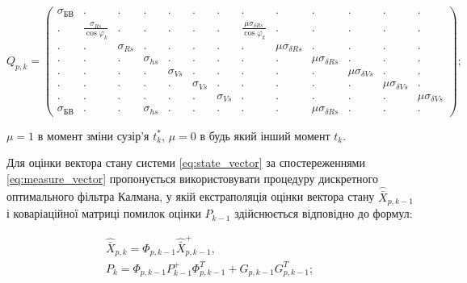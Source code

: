 \[Q_{p,k} =\left(
\begin{array}{ccccccccccccc} 
{\scriptstyle \sigma_{\text{БВ}} } & {.} & {.} & {.} & {.} & {.} & {.} & {.} & {.} & {.} & {.} & {.} & {.} \\ 
{.} & {\scriptstyle \frac{\sigma_{Rs}}{\cos \varphi_{k}}}& {.} & {.} & {.} & {.} & {.} & 
{\scriptstyle \frac{\mu \sigma_{\delta Rs}}{\cos \varphi_{k}}} & {.} & {.} & {.} & {.} & {.} \\ 
{.} & {.} & { \scriptstyle\sigma_{Rs} } & {.} & {.} & {.} & {.} & {.} & {\scriptstyle \mu \sigma_{\delta Rs} } & {.} & {.} & {.} & {.} \\ 
{.} & {.} & {.} & {\scriptstyle \sigma_{hs} } & {.} & {.} & {.} & {.} & {.} & {\scriptstyle \mu \sigma_{\delta Rs} } & {.} & {.} & {.} \\ 
{.} & {.} & {.} & {.} & {\scriptstyle \sigma_{Vs} } & {.} & {.} & {.} & {.} & {.} & {\scriptstyle \mu \sigma_{\delta Vs} } & {.} & {.} \\ 
{.} & {.} & {.} & {.} & {.} & {\scriptstyle \sigma_{Vs} } & {.} & {.} & {.} & {.} & {.} & {\scriptstyle \mu \sigma_{\delta Vs} } & {.} \\ 
{.} & {.} & {.} & {.} & {.} & {.} & {\scriptstyle \sigma_{Vs} } & {.} & {.} & {.} & {.} & {.} & {\scriptstyle \mu \sigma_{\delta Vs} } \\ 
{\scriptstyle \sigma_{\text{БВ}}} & {.} & {.} & { \scriptstyle\sigma_{hs} } & {.} & {.} & {.} & {.} & {.} & {\scriptstyle \mu \sigma_{\delta Rs}} & {.} & {.} & {.} 
\end{array}\right);\] 
\begin{ESKDexplanation}
\item $\mu =1$ в момент зміни сузір'я $t_{k}^{*} $, $\mu =0$ в будь який інший момент $t_{k}^{} $.
\end{ESKDexplanation}

Для оцінки вектора стану системи \eqref{eq:state_vector} за спостереженнями \eqref{eq:measure_vector} 
пропонується використовувати процедуру дискретного оптимального фільтра Калмана, 
у якій екстраполяція оцінки вектора стану $\stackrel{\frown}{\bar{X}}_{p,k-1} $ і 
коваріаційної матриці помилок оцінки $P_{k-1} $ здійснюється відповідно до формул:

\begin{equation} 
\label{eq:kalman_predict} \begin{array}{l} 
{\hat{\bar{X}}_{p,k} =\Phi_{p,k-1} \hat{\bar{X}}^{+}_{p,k-1} ,} \\ 
{P_{k} =\Phi_{p,k-1} P^{+}_{k-1} \Phi ^{T}_{p,k-1} +G_{p,k-1} G_{p,k-1}^{T} ;} \end{array} 
\end{equation} 

